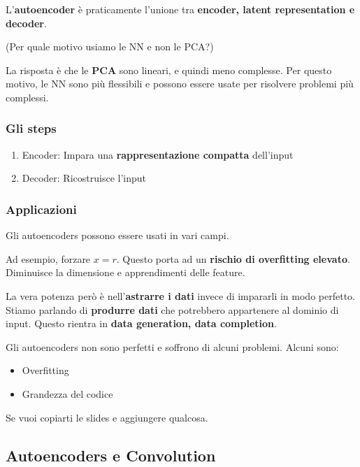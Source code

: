 L'\textbf{autoencoder} è praticamente l'unione tra \textbf{encoder, latent
    representation e decoder}.

\begin{domanda}(Per quale motivo usiamo le NN e non le PCA?)
\end{domanda}

La risposta è che le \textbf{PCA} sono lineari, e quindi meno complesse. Per
questo motivo, le NN sono più flessibili e possono essere usate per risolvere
problemi più complessi.

\subsubsection{Gli steps}

\begin{enumerate}
    \item Encoder: Impara una \textbf{rappresentazione compatta} dell'input
    \item Decoder: Ricostruisce l'input
\end{enumerate}

\subsubsection{Applicazioni}

Gli autoencoders possono essere usati in vari campi.

Ad esempio, forzare $x = r$. Questo porta ad un \textbf{rischio di overfitting
    elevato}. Diminuisce la dimensione e apprendimenti delle feature.

La vera potenza però è nell'\textbf{astrarre i dati} invece di impararli in
modo perfetto. Stiamo parlando di \textbf{produrre dati} che potrebbero
appartenere al dominio di input. Questo rientra in \textbf{data generation, data completion}.

Gli autoencoders non sono perfetti e soffrono di alcuni problemi. Alcuni sono:
\begin{itemize}
    \item Overfitting
    \item Grandezza del codice
\end{itemize}

Se vuoi copiarti le slides e aggiungere qualcosa.

\subsection{Autoencoders e Convolution}

